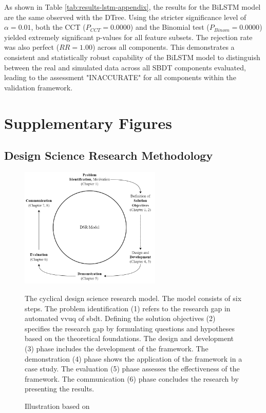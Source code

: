 \begin{appendices}
  As shown in Table \ref{tab:results-lstm-appendix}, the results for the BiLSTM model are the same observed with the DTree. Using the stricter significance level of $\alpha=0.01$, both the CCT ($P_{CCT}=0.0000$) and the Binomial test ($P_{Binom}=0.0000$) yielded extremely significant p-values for all feature subsets. The rejection rate was also perfect ($RR=1.00$) across all components. This demonstrates a consistent and statistically robust capability of the BiLSTM model to distinguish between the real and simulated data across all SBDT components evaluated, leading to the assessment "INACCURATE" for all components within the validation framework.


  \chapter{Supplementary Figures} %
  \label{app:supp_figures} %

  \section{Design Science Research Methodology}
  \label{app:dsr_figure} %
  \begin{figure}[htbp] %
    \centering
    \includegraphics[width=0.6\textwidth]{figures/dsr.png}
    \caption[Design Science Methodology]{The cyclical design science research model. The model consists of six steps. The problem identification (1) refers to the research gap in automated \gls{vvuq} of \gls{sbdt}. Defining the solution objectives (2) specifies the research gap by formulating questions and hypotheses based on the theoretical foundations. The design and development (3) phase includes the development of the framework. The demonstration (4) phase shows the application of the framework in a case study. The evaluation (5) phase assesses the effectiveness of the framework. The communication (6) phase concludes the research by presenting the results.}
    \label{fig:DSR} %
    \caption*{Illustration based on \textcite{peffers2007design}}
  \end{figure}


\end{appendices}
